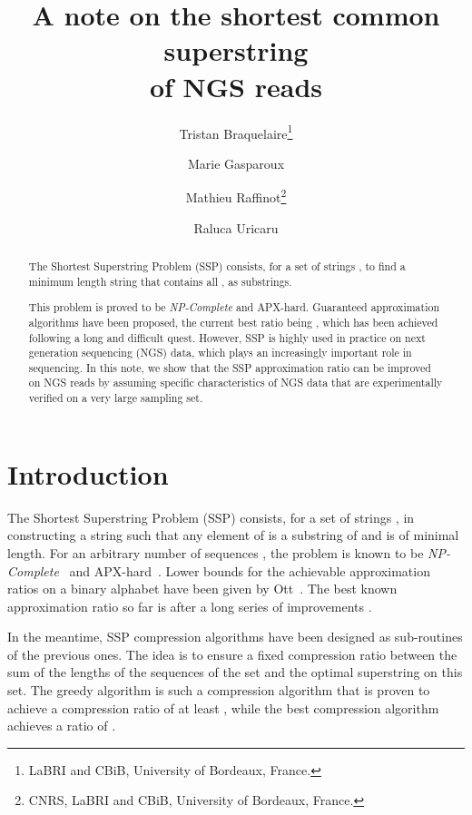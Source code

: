 \documentclass[10pt]{article}
\begin{document}
\title{A note on the shortest common superstring\\ of NGS reads}

\author{Tristan Braquelaire\thanks{LaBRI and CBiB, University of Bordeaux, France.} \and Marie Gasparoux \and Mathieu Raffinot\thanks{CNRS, LaBRI and CBiB, University of Bordeaux, France.} \and Raluca Uricaru}

\maketitle


\begin{abstract}
The Shortest Superstring Problem (SSP) consists, for a set of strings
, to find a minimum length string that
contains all , as substrings.


 This problem is proved to be {\em NP-Complete} and APX-hard. Guaranteed
 approximation algorithms have been proposed, the current best ratio
 being , which has been achieved following a long and
 difficult quest. However, SSP is highly used in practice on next
 generation sequencing (NGS) data, which plays an increasingly important role in sequencing. In this note, we show that the SSP approximation ratio can be
 improved on NGS reads by assuming specific characteristics of NGS data
 that are experimentally verified on a very large sampling set.
\end{abstract}  


\section{Introduction}

The Shortest Superstring Problem (SSP) consists, for a set of strings
, in constructing a string  such that any
element of  is a substring of  and  is of minimal length.
For an arbitrary number of sequences , the problem is known to be {\em NP-Complete}~\cite{GALLANT198050, Garey1990}
and APX-hard~\cite{Blum:1994}. Lower bounds for the achievable approximation ratios
on a binary alphabet have been given by
Ott~\cite{Ott1999}. The best known approximation ratio so far is  \cite{Mucha13} after a long series of improvements
\cite{l-tdstls-90, Blum:1994,KPS94,
  Armen1995,Armen199829,Breslauer1997340,
  Czumaj199774,Sweedyk:1999,TengY97, KaplanS05, PaluchEZ12}.

In the meantime, SSP compression algorithms have been designed as
sub-routines of the previous ones. The idea is to ensure a fixed
compression ratio between the sum of the lengths of the sequences of
the set and the optimal superstring on this set. The greedy algorithm
is such a compression algorithm that is proven to achieve a
compression ratio of at least , while the best
compression algorithm achieves a ratio of 
\cite{KPS94}.
\end{document}
